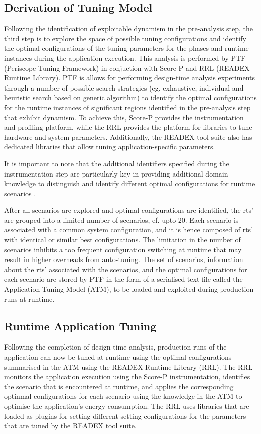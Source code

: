 \subsection{Derivation of Tuning Model}
\label{sec:tuning_model_generation}
Following the identification of exploitable dynamism in the pre-analysis step, the third step is to explore the space of possible tuning configurations and identify the optimal configurations of the tuning parameters for the phases and runtime instances during the application execution. This analysis is performed by PTF (Periscope Tuning Framework) in conjuction with Score-P and RRL (READEX Runtime Library). PTF is allows for performing design-time analysis experiments through a number of possible search strategies (eg. exhaustive, individual and heuristic search based on generic algorithm) to identify the optimal configurations for the runtime instances of significant regions identified in the pre-analysis step that exhibit dynamism. To achieve this, Score-P provides the instrumentation and profiling platform, while the RRL provides the platform for libraries to tune hardware and system parameters. Additionally, the READEX tool suite also has dedicated libraries that allow tuning application-specific parameters.

It is important to note that the additional identifiers specified during the instrumentation step are particularly key in providing additional domain knowledge to distinguish and identify different optimal configurations for runtime scenarios \cite{PACO17}.

After all scenarios are explored and optimal configurations are identified, the rts' are grouped into a limited number of scenarios, ef. upto 20. Each scenario is associated with a common system configuration, and it is hence composed of rts' with identical or similar best configurations. The limitation in the number of scenarios inhibits a too frequent configuration switching at runtime that may result in higher overheads from auto-tuning. The set of scenarios, information about the rts' associated with the scenarios, and the optimal configurations for each scenario are stored by PTF in the form of a serialised text file called the Application Tuning Model (ATM), to be loaded and exploited during production runs at runtime.

\subsection{Runtime Application Tuning}
\label{sec:runtime_tuning}
Following the completion of design time analysis, production runs of the application can now be tuned at runtime using the optimal configurations summarised in the ATM using the READEX Runtime Library (RRL). The RRL monitors the application execution using the Score-P instrumentation, identifies the scenario that is encountered at runtime, and applies the corresponding optinmal configurations for each scenario using the knowledge in the ATM to optimise the application's energy consumption. The RRL uses libraries that are loaded as plugins for setting different setting configurations for the parameters that are tuned by the READEX tool suite.

